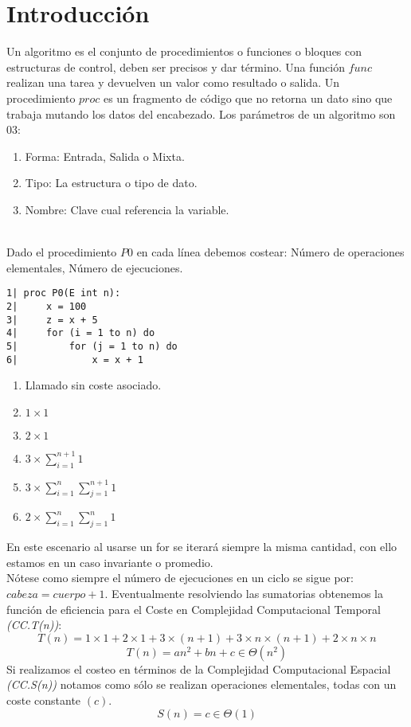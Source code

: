 \documentclass[tikz,11pt,fleqn]{book} %
\begin{document}
\section{Introducción}
Un algoritmo es el conjunto de procedimientos o funciones o bloques con estructuras de control, deben ser precisos y dar término.
Una función $func$ realizan una tarea y devuelven un valor como resultado o salida.
Un procedimiento $proc$ es un fragmento de código que no retorna un dato sino que trabaja mutando los datos del encabezado.
Los parámetros de un algoritmo son 03:
\begin{enumerate}
    \item Forma: Entrada, Salida o Mixta.
    \item Tipo: La estructura o tipo de dato.
    \item Nombre: Clave cual referencia la variable.
\end{enumerate}
\begin{example}~
\\

Dado el procedimiento $P0$ en cada línea debemos costear: Número de operaciones elementales, Número de ejecuciones.
    \begin{multicols}{2}
        \begin{lstlisting}
1| proc P0(E int n):
2|     x = 100
3|     z = x + 5
4|     for (i = 1 to n) do
5|         for (j = 1 to n) do
6|             x = x + 1
        \end{lstlisting}        
        \columnbreak
        \begin{enumerate}
            \item Llamado sin coste asociado.
            \item $1\times1$
            \item $2\times1$
            \item $3\times\sum_{i=1}^{n+1}1$
            \item $3\times\sum_{i=1}^{n}\sum_{j=1}^{n+1}1$
            \item $2\times\sum_{i=1}^{n}\sum_{j=1}^{n}1$
        \end{enumerate}
    \end{multicols}
En este escenario al usarse un for se iterará siempre la misma cantidad, con ello estamos en un caso invariante o promedio.
\\Nótese como siempre el número de ejecuciones en un ciclo se sigue por: $cabeza=cuerpo+1$.
Eventualmente resolviendo las sumatorias obtenemos la función de eficiencia para el Coste en Complejidad Computacional Temporal \textit{(CC.T(n))}:
$$
T(n)=1\times1+2\times1+3\times(n+1)+3\times n\times(n+1)+2\times n\times n
$$ $$
    T(n)=an^2+bn+c\in \Theta(n^2)
$$
Si realizamos el costeo en términos de la Complejidad Computacional Espacial \textit{(CC.S(n))} notamos como sólo se realizan operaciones elementales, todas con un coste constante $(c)$.
$$
    S(n)=c\in\Theta(1)
$$
\end{example}
\end{document}
